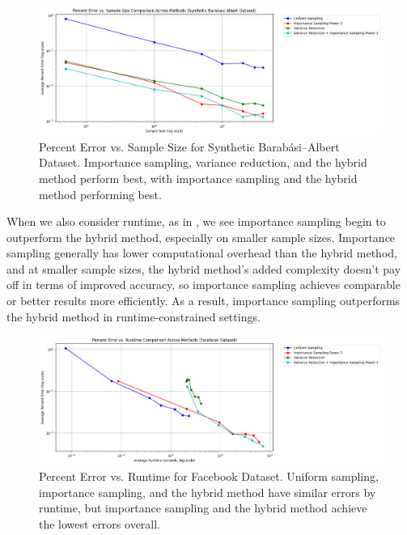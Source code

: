 \documentclass[11pt, margin=1in]{article}
\begin{document}
\begin{figure}[H]
\centering
\includegraphics[width=0.9\linewidth]{plots/comparisons/ba/limited_method_percent_error_vs_sample_size_comparison.png}
\caption{Percent Error vs. Sample Size for Synthetic Barabási–Albert Dataset. Importance sampling, variance reduction, and the hybrid method perform best, with importance sampling and the hybrid method performing best.}
\label{fig:ba_sample_size}
\end{figure}

When we also consider runtime, as in , we see importance sampling begin to outperform the hybrid method, especially on smaller sample sizes.
Importance sampling generally has lower computational overhead than the hybrid method, and at smaller sample sizes, the hybrid method's added complexity doesn't pay off in terms of improved accuracy, so importance sampling achieves comparable or better results more efficiently.
As a result, importance sampling outperforms the hybrid method in runtime-constrained settings.

\begin{figure}[H]
\centering
\includegraphics[width=0.9\linewidth]{plots/comparisons/fb/limited_method_percent_error_vs_runtime_comparison.png}
\caption{Percent Error vs. Runtime for Facebook Dataset. Uniform sampling, importance sampling, and the hybrid method have similar errors by runtime, but importance sampling and the hybrid method achieve the lowest errors overall.}
\label{fig:fb_runtime}
\end{figure}
\end{document}
